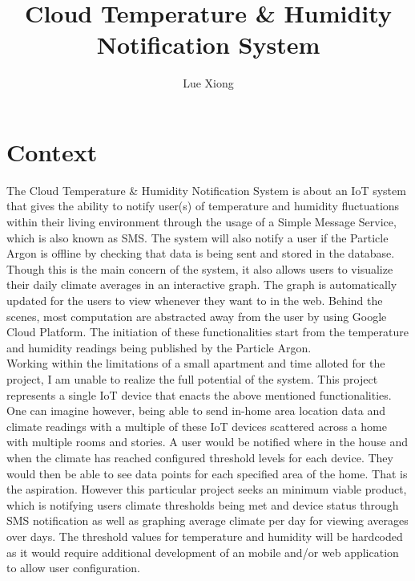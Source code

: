 \documentclass{article}
\title{Cloud Temperature \& Humidity Notification System}
\author{Lue Xiong}
\begin{document}
\maketitle
\newpage

\tableofcontents
\newpage

\obeylines

\section{Context}
The Cloud Temperature \& Humidity Notification System is about an IoT system that gives the ability to notify user(s) of temperature and humidity fluctuations within their living environment through the usage of a Simple Message Service, which is also known as SMS. The system will also notify a user if the Particle Argon is offline by checking that data is being sent and stored in the database. Though this is the main concern of the system, it also allows users to visualize their daily climate averages in an interactive graph. The graph is automatically updated for the users to view whenever they want to in the web. Behind the scenes, most computation are abstracted away from the user by using Google Cloud Platform. The initiation of these functionalities start from the temperature and humidity readings being published by the Particle Argon.\\

Working within the limitations of a small apartment and time alloted for the project, I am unable to realize the full potential of the system. This project represents a single IoT device that enacts the above mentioned functionalities. One can imagine however, being able to send in-home area location data and climate readings with a multiple of these IoT devices scattered across a home with multiple rooms and stories. A user would be notified where in the house and when the climate has reached configured threshold levels for each device. They would then be able to see data points for each specified area of the home. That is the aspiration. However this particular project seeks an minimum viable product, which is notifying users climate thresholds being met and device status through SMS notification as well as graphing average climate per day for viewing averages over days. The threshold values for temperature and humidity will be hardcoded as it would require additional development of an mobile and/or web application to allow user configuration.\\
\end{document}
